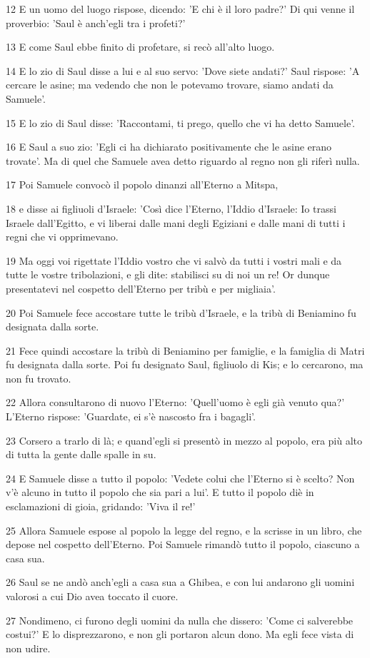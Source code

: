 \par 12 E un uomo del luogo rispose, dicendo: 'E chi è il loro padre?' Di qui venne il proverbio: 'Saul è anch'egli tra i profeti?'
\par 13 E come Saul ebbe finito di profetare, si recò all'alto luogo.
\par 14 E lo zio di Saul disse a lui e al suo servo: 'Dove siete andati?' Saul rispose: 'A cercare le asine; ma vedendo che non le potevamo trovare, siamo andati da Samuele'.
\par 15 E lo zio di Saul disse: 'Raccontami, ti prego, quello che vi ha detto Samuele'.
\par 16 E Saul a suo zio: 'Egli ci ha dichiarato positivamente che le asine erano trovate'. Ma di quel che Samuele avea detto riguardo al regno non gli riferì nulla.
\par 17 Poi Samuele convocò il popolo dinanzi all'Eterno a Mitspa,
\par 18 e disse ai figliuoli d'Israele: 'Così dice l'Eterno, l'Iddio d'Israele: Io trassi Israele dall'Egitto, e vi liberai dalle mani degli Egiziani e dalle mani di tutti i regni che vi opprimevano.
\par 19 Ma oggi voi rigettate l'Iddio vostro che vi salvò da tutti i vostri mali e da tutte le vostre tribolazioni, e gli dite: stabilisci su di noi un re! Or dunque presentatevi nel cospetto dell'Eterno per tribù e per migliaia'.
\par 20 Poi Samuele fece accostare tutte le tribù d'Israele, e la tribù di Beniamino fu designata dalla sorte.
\par 21 Fece quindi accostare la tribù di Beniamino per famiglie, e la famiglia di Matri fu designata dalla sorte. Poi fu designato Saul, figliuolo di Kis; e lo cercarono, ma non fu trovato.
\par 22 Allora consultarono di nuovo l'Eterno: 'Quell'uomo è egli già venuto qua?' L'Eterno rispose: 'Guardate, ei s'è nascosto fra i bagagli'.
\par 23 Corsero a trarlo di là; e quand'egli si presentò in mezzo al popolo, era più alto di tutta la gente dalle spalle in su.
\par 24 E Samuele disse a tutto il popolo: 'Vedete colui che l'Eterno si è scelto? Non v'è alcuno in tutto il popolo che sia pari a lui'. E tutto il popolo diè in esclamazioni di gioia, gridando: 'Viva il re!'
\par 25 Allora Samuele espose al popolo la legge del regno, e la scrisse in un libro, che depose nel cospetto dell'Eterno. Poi Samuele rimandò tutto il popolo, ciascuno a casa sua.
\par 26 Saul se ne andò anch'egli a casa sua a Ghibea, e con lui andarono gli uomini valorosi a cui Dio avea toccato il cuore.
\par 27 Nondimeno, ci furono degli uomini da nulla che dissero: 'Come ci salverebbe costui?' E lo disprezzarono, e non gli portaron alcun dono. Ma egli fece vista di non udire.

